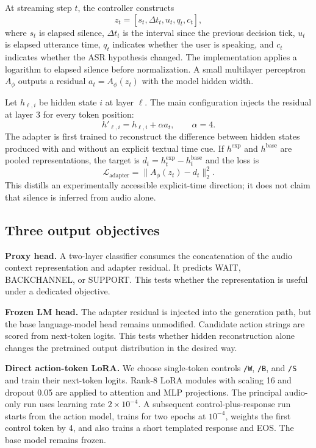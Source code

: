 \documentclass[10pt,twocolumn]{article}
\newcommand{\code}[1]{\texttt{#1}}
\begin{document}
At streaming step $t$, the controller constructs
\begin{equation}
z_t=[s_t,\Delta t_t,u_t,q_t,c_t],
\end{equation}
where $s_t$ is elapsed silence, $\Delta t_t$ is the interval since the previous decision tick, $u_t$ is elapsed utterance time, $q_t$ indicates whether the user is speaking, and $c_t$ indicates whether the ASR hypothesis changed. The implementation applies a logarithm to elapsed silence before normalization. A small multilayer perceptron $A_{\phi}$ outputs a residual $a_t=A_{\phi}(z_t)$ with the model hidden width.

Let $h_{\ell,i}$ be hidden state $i$ at layer $\ell$. The main configuration injects the residual at layer 3 for every token position:
\begin{equation}
h'_{\ell,i}=h_{\ell,i}+\alpha a_t,\qquad \alpha=4.
\label{eq:inject}
\end{equation}
The adapter is first trained to reconstruct the difference between hidden states produced with and without an explicit textual time cue. If $h^{\mathrm{exp}}$ and $h^{\mathrm{base}}$ are pooled representations, the target is $d_t=h^{\mathrm{exp}}_t-h^{\mathrm{base}}_t$ and the loss is
\begin{equation}
\mathcal{L}_{\mathrm{adapter}}=\lVert A_{\phi}(z_t)-d_t\rVert_2^2.
\end{equation}
This distills an experimentally accessible explicit-time direction; it does not claim that silence is inferred from audio alone.

\subsection{Three output objectives}

\textbf{Proxy head.} A two-layer classifier consumes the concatenation of the audio context representation and adapter residual. It predicts WAIT, BACKCHANNEL, or SUPPORT. This tests whether the representation is useful under a dedicated objective.

\textbf{Frozen LM head.} The adapter residual is injected into the generation path, but the base language-model head remains unmodified. Candidate action strings are scored from next-token logits. This tests whether hidden reconstruction alone changes the pretrained output distribution in the desired way.

\textbf{Direct action-token LoRA.} We choose single-token controls \code{/W}, \code{/B}, and \code{/S} and train their next-token logits. Rank-8 LoRA modules with scaling 16 and dropout 0.05 are applied to attention and MLP projections. The principal audio-only run uses learning rate $2\times10^{-4}$. A subsequent control-plus-response run starts from the action model, trains for two epochs at $10^{-4}$, weights the first control token by 4, and also trains a short templated response and EOS. The base model remains frozen.
\end{document}
